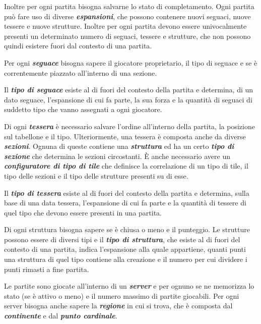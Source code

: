Inoltre per ogni partita bisogna salvarne lo stato di completamento. Ogni partita può fare uso di diverse \textbf{\emph{espansioni}}, che possono contenere nuovi seguaci, nuove tessere e nuove strutture. Inoltre per ogni partita devono essere univocalmente presenti un determinato numero di seguaci, tessere e strutture, che non possono quindi esistere fuori dal contesto di una partita.
\medskip

Per ogni \textbf{\emph{seguace}} bisogna sapere il giocatore proprietario, il tipo di seguace e se è correntemente piazzato all'interno di una sezione.
\medskip

Il \textbf{\emph{tipo di seguace}} esiste al di fuori del contesto della partita e determina, di un dato seguace, l'espansione di cui fa parte, la sua forza e la quantità di seguaci di suddetto tipo che vanno assegnati a ogni giocatore.
\medskip

Di ogni \textbf{\emph{tessera}} è necessario salvare l'ordine all'interno della partita, la posizione sul tabellone e il tipo. Ulteriormente, una tessera è composta anche da diverse \textbf{\emph{sezioni}}. Ognuna di queste contiene una \textbf{\emph{struttura}} ed ha un certo \textbf{\emph{tipo di sezione}} che determina le sezioni circostanti. È anche necessario avere un \textbf{\emph{configuratore di tipo di tile}} che definisce la correlazione di un tipo di tile, il tipo delle sezioni e il tipo delle strutture presenti su di esse.
\medskip

Il \textbf{\emph{tipo di tessera}} esiste al di fuori del contesto della partita e determina, sulla base di una data tessera, l'espansione di cui fa parte e la quantità di tessere di quel tipo che devono essere presenti in una partita.
\medskip

Di ogni struttura bisogna sapere se è chiusa o meno e il punteggio. Le strutture possono essere di diversi tipi e il \textbf{\emph{tipo di struttura}}, che esiste al di fuori del contesto di una partita, indica l'espansione alla quale appartiene, quanti punti una struttura di quel tipo contiene alla creazione e il numero per cui dividere i punti rimasti a fine partita.
\medskip

Le partite sono giocate all'interno di un \textbf{\emph{server}} e per ognuno se ne memorizza lo stato (se è attivo o meno) e il numero massimo di partite giocabili. Per ogni server bisogna anche sapere la \textbf{\emph{regione}} in cui si trova, che è composta dal \textbf{\emph{continente}} e dal \textbf{\emph{punto cardinale}}.
\medskip

